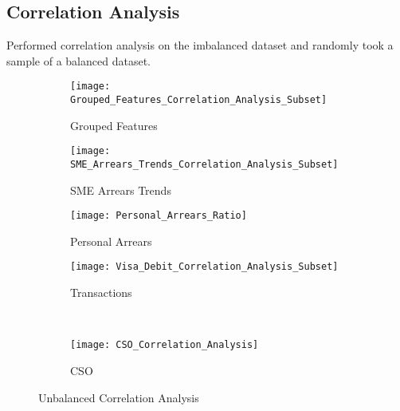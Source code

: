 \subsection{Correlation Analysis}

Performed correlation analysis on the imbalanced dataset and randomly took a sample of a balanced dataset.

\begin{figure}[H]
	\centering
		\begin{subfigure}[b]{0.32\textwidth}
			\captionsetup{font=scriptsize}
			\texttt{[image: Grouped\_Features\_Correlation\_Analysis\_Subset]}\caption{Grouped Features}\label{fig:groupedFeaturesCorrelation}
		\end{subfigure} 
		\begin{subfigure}[b]{0.32\textwidth}
			\captionsetup{font=scriptsize}
			\texttt{[image: SME\_Arrears\_Trends\_Correlation\_Analysis\_Subset]}
			\caption{SME Arrears Trends}\label{fig:smeArrearsCorrelation}
		\end{subfigure} 
		\begin{subfigure}[b]{0.32\textwidth}
			\captionsetup{font=scriptsize}
			\texttt{[image: Personal\_Arrears\_Ratio]}
			\caption{Personal Arrears}\label{fig:personalArrearsCorrelation}
		\end{subfigure} 
	\medskip
	\begin{subfigure}[b]{0.32\textwidth}
		\captionsetup{font=scriptsize}
		\texttt{[image: Visa\_Debit\_Correlation\_Analysis\_Subset]}
		\caption{Transactions}\label{fig:transVisaCorrelation}
	\end{subfigure} ~\quad
	\begin{subfigure}[b]{0.32\textwidth}
		\captionsetup{font=scriptsize}
		\texttt{[image: CSO\_Correlation\_Analysis]}
		\caption{CSO}\label{fig:CSOCorrelation}
	\end{subfigure}
\caption{Unbalanced Correlation Analysis}
\label{fig:unbal_corr_analysis}
\end{figure}
	
